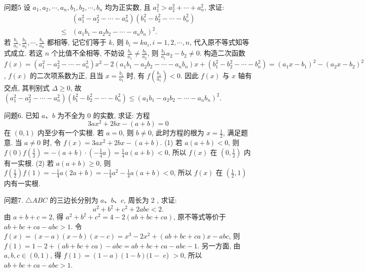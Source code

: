 问题5 设 $a_1, a_2, \cdots, a_n, b_1, b_2, \cdots, b_n$ 均为正实数, 且 $a_1^2>a_2^2+\cdots+a_n^2$, 求证:
$$
\begin{aligned}
& \left(a_1^2-a_2^2-\cdots-a_n^2\right)\left(b_1^2-b_2^2-\cdots-b_n^2\right) \\
\leqslant & \left(a_1 b_1-a_2 b_2-\cdots-a_n b_n\right)^2 .
\end{aligned}
$$
若 $\frac{b_1}{a_1}, \frac{b_2}{a_2}, \cdots, \frac{b_n}{a_n}$ 都相等, 记它们等于 $k$, 则 $b_i=k a_i, i=1,2, \cdots, n$, 代入原不等式知等式成立.
若这 $n$ 个比值不全相等, 不妨设 $\frac{b_1}{a_1} \neq \frac{b_2}{a_2}$, 则 $\frac{b_1}{a_1} a_2- b_2 \neq 0$. 构造二次函数 $f(x)=\left(a_1^2-a_2^2-\cdots-a_n^2\right) x^2-2\left(a_1 b_1-a_2 b_2-\cdots-\right. \left.a_n b_n\right) x+\left(b_1^2-b_2^2-\cdots-b_n^2\right)=\left(a_1 x-b_1\right)^2-\left(a_2 x-b_2\right)^2-\cdots-\left(a_n x-b_n\right)^2$, $f(x)$ 的二次项系数为正, 且当 $x=\frac{b_1}{a_1}$ 时, 有 $f\left(\frac{b_1}{a_1}\right)<0$. 因此 $f(x)$ 与 $x$ 轴有交点, 其判别式 $\Delta \geqslant 0$, 故 $\left(a_1^2-a_2^2-\cdots-a_n^2\right)\left(b_1^2-b_2^2-\cdots-b_n^2\right) \leqslant\left(a_1 b_1-a_2 b_2-\cdots-a_n b_n\right)^2$.



问题6. 已知 $a 、 b$ 为不全为 0 的实数, 求证: 方程
$$
3 a x^2+2 b x-(a+b)=0
$$
在 $(0,1)$ 内至少有一个实根.
若 $a=0$, 则 $b \neq 0$, 此时方程的根为 $x=\frac{1}{2}$, 满足题意.
当 $a \neq 0$ 时, 令 $f(x)=3 a x^2+2 b x-(a+b)$. 
(1) 若 $a(a+b)<0$, 则 $f(0) f\left(\frac{1}{2}\right)= -(a+b) \cdot\left(-\frac{1}{4} a\right)=\frac{1}{4} a(a+b)<0$, 所以 $f(x)$ 在 $\left(0, \frac{1}{2}\right)$ 内有一实根.
(2) 若 $a(a+b) \geqslant 0$, 则 $f\left(\frac{1}{2}\right) f(1)=-\frac{1}{4} a(2 a+b)=-\frac{1}{4} a^2-\frac{1}{4} a(a+ b)<0$, 所以 $f(x)$ 在 $\left(\frac{1}{2}, 1\right)$ 内有一实根.



问题7. $\triangle A B C$ 的三边长分别为 $a 、 b 、 c$, 周长为 2 , 求证:
$$
a^2+b^2+c^2+2 a b c<2 .
$$
由 $a+b+c=2$, 得 $a^2+b^2+c^2=4-2(a b+b c+c a)$, 原不等式等价于 $a b+b c+c a-a b c>1$. 令 $f(x)=(x-a)(x-b)(x-c)=x^3-2 x^2+ (a b+b c+c a) x-a b c$, 则 $f(1)=1-2+(a b+b c+c a)-a b c=a b+b c+ c a-a b c-1$. 另一方面, 由 $a, b, c \in(0,1)$, 得 $f(1)=(1-a)(1-b)(1-$ c) $>0$, 所以 $a b+b c+c a-a b c>1$.



